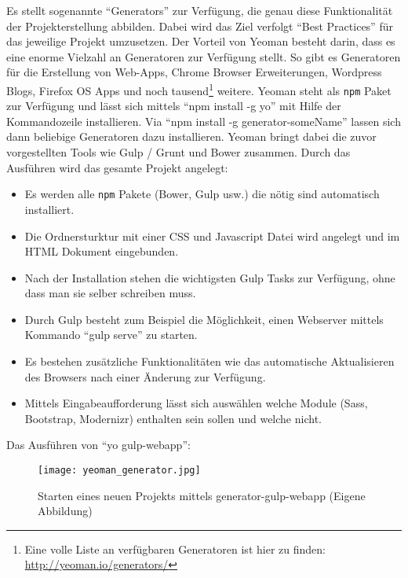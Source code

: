 		Es stellt sogenannte "`Generators"' zur Verfügung, die genau diese Funktionalität der Projekterstellung abbilden. Dabei wird das Ziel verfolgt "`Best Practices"' für das jeweilige Projekt umzusetzen.
		Der Vorteil von Yeoman besteht darin, dass es eine enorme Vielzahl an Generatoren zur Verfügung stellt. So gibt es Generatoren für die Erstellung von Web-Apps, Chrome Browser Erweiterungen, Wordpress Blogs, Firefox OS Apps und noch tausend\footnote{Eine volle Liste an verfügbaren Generatoren ist hier zu finden: \url{http://yeoman.io/generators/}} weitere. 
		Yeoman steht als \texttt{npm} Paket zur Verfügung und lässt sich mittels "`npm install -g yo"' mit Hilfe der Kommandozeile installieren. Via "`npm install -g generator-someName"' lassen sich dann beliebige Generatoren dazu installieren. Yeoman bringt dabei die zuvor vorgestellten Tools wie Gulp / Grunt und Bower zusammen. Durch das Ausführen wird das gesamte Projekt angelegt:
		
		\begin{itemize}
			\item Es werden alle \texttt{npm} Pakete (Bower, Gulp usw.) die nötig sind automatisch installiert.
			\item Die Ordnersturktur mit einer CSS und Javascript Datei wird angelegt und im HTML Dokument eingebunden.
			\item Nach der Installation stehen die wichtigsten Gulp Tasks zur Verfügung, ohne dass man sie selber schreiben muss.
			\item Durch Gulp besteht zum Beispiel die Möglichkeit, einen Webserver mittels Kommando "`gulp serve"' zu starten.
			\item Es bestehen zusätzliche Funktionalitäten wie das automatische Aktualisieren des Browsers nach einer Änderung zur Verfügung.
			\item Mittels Eingabeaufforderung lässt sich auswählen welche Module (Sass, Bootstrap, Modernizr) enthalten sein sollen und welche nicht.
		\end{itemize}

		Das Ausführen von "`yo gulp-webapp"':
		\begin{figure}[htbp]
			\begin{center}
				\texttt{[image: yeoman\_generator.jpg]}
				\caption{Starten eines neuen Projekts mittels generator-gulp-webapp (Eigene Abbildung)}
				\label{fig:yeoman_generator}
			\end{center}
		\end{figure}

